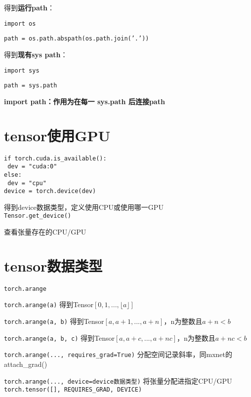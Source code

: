 \documentclass[UTF8]{ctexart}
\begin{document}
  得到\textbf{运行path}：

  \quad \texttt{import os}

  \quad \texttt{path = os.path.abspath(os.path.join('.'))}

  得到\textbf{现有sys path}：

  \quad \texttt{import sys}

  \quad \texttt{path = sys.path}

  \textbf{import path：作用为在每一 sys.path 后连接path}


\section{tensor使用GPU}
\noindent \texttt{}
\texttt{if torch.cuda.is\_available():}\\
\texttt{  dev = "cuda:0"}\\
\texttt{else:}\\
\texttt{  dev = "cpu"}\\
\texttt{device = torch.device(dev)}

  得到device数据类型，定义使用CPU或使用哪一GPU\\
\texttt{Tensor.get\_device()}

  查看张量存在的CPU/GPU



\section{tensor数据类型}
\noindent \texttt{torch.arange}

  \texttt{torch.arange(a)} 得到Tensor$[0, 1, ..., \lfloor a \rfloor]$

  \texttt{torch.arange(a, b)} 得到Tensor$[a, a+1, ..., a+n]$，n为整数且$a+n < b$

  \texttt{torch.arange(a, b, c)} 得到Tensor$[a, a+c, ..., a+nc]$，n为整数且$a+nc < b$
  
  \texttt{torch.arange(..., requires\_grad=True)} 分配空间记录斜率，同mxnet的attach\_grad()
  
  \texttt{torch.arange(..., device=device数据类型)} 将张量分配进指定CPU/GPU\\
\texttt{torch.tensor([], REQUIRES\_GRAD, DEVICE)}
  
\end{document}
